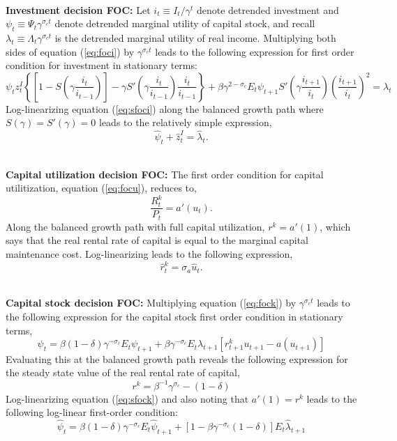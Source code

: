 \documentclass[11pt]{article}
\newcommand{\beq}{\begin{equation}}
\newcommand{\eeq}{\end{equation}}
\newcommand{\eqref}[1]{(\ref{#1})}
\begin{document}
\ \\
\textbf{Investment decision FOC:} Let $i_t \equiv I_t / \gamma^t$ denote detrended investment and $\psi_t \equiv \Psi_t \gamma^{\sigma_c t}$ denote detrended marginal utility of capital stock, and recall $\lambda_t \equiv \Lambda_t \gamma^{\sigma_c t}$ is the detrended marginal utility of real income.  Multiplying both sides of equation \eqref{eq:foci} by $\gamma^{\sigma_c t}$ leads to the following expression for first order condition for investment in stationary terms:
\beq \label{eq:sfoci} \psi_t z_t^I \left\{ \left[1-S\left(\gamma \frac{i_t}{i_{t-1}}\right)\right] - \gamma S'\left(\gamma \frac{i_t}{i_{t-1}}\right) \frac{i_t}{i_{t-1}} \right\} 
+ \beta \gamma^{2-\sigma_c} E_t \psi_{t+1} S'\left(\gamma \frac{i_{t+1}}{i_t}\right)  \left(\frac{i_{t+1}}{i_t}\right)^2 = \lambda_t  \eeq
Log-linearizing equation \eqref{eq:sfoci} along the balanced growth path where $S(\gamma)=S'(\gamma)=0$ leads to the relatively simple expression,
\beq \hat{\psi}_t + \hat{z}_t^I = \hat{\lambda}_t. \eeq

\ \\
\textbf{Capital utilization decision FOC:} The first order condition for capital utilitization, equation \eqref{eq:focu}, reduces to,
\beq \frac{R_t^k}{P_t} = a'(u_t). \eeq
Along the balanced growth path with full capital utilization, $r^k = a'(1)$, which says that the real rental rate of capital is equal to the marginal capital maintenance cost.  Log-linearizing leads to the following expression,
\beq \label{eq:lnfocu} \hat{r}_t^k = \sigma_a \hat{u}_t. \eeq

\ \\
\textbf{Capital stock decision FOC:} Multiplying equation \eqref{eq:fock} by $\gamma^{\sigma_c t}$ leads to the following expression for the capital stock first order condition in stationary terms,
\beq \label{eq:sfock} \psi_t = \beta (1-\delta) \gamma^{-\sigma_c} E_t \psi_{t+1} + \beta \gamma^{-\sigma_c} E_t \lambda_{t+1} \left[r_{t+1}^k u_{t+1} - a(u_{t+1})\right] \eeq
Evaluating this at the balanced growth path reveals the following expression for the steady state value of the real rental rate of capital,
\beq \label{eq:ssrk} r^k = \beta^{-1} \gamma^{\sigma_c} - (1-\delta) \eeq
Log-linearizing equation \eqref{eq:sfock} and also noting that $a'(1)=r^k$ leads to the following log-linear first-order condition:
\beq \label{eq:lnfock} \hat{\psi}_t = \beta (1-\delta) \gamma^{-\sigma_c} E_t \hat{\psi}_{t+1} + \left[1-\beta\gamma^{-\sigma_c}(1-\delta)\right] E_t \hat{\lambda}_{t+1} \eeq
\end{document}
